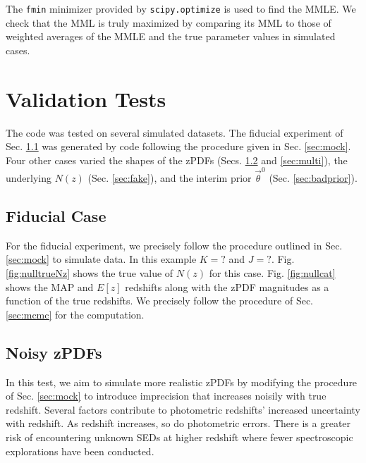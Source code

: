 \documentclass[preprint]{aastex}
\begin{document}
The \texttt{fmin} minimizer provided by \texttt{scipy.optimize} is used to find 
the MMLE.  We check that the MML is truly maximized by comparing its MML to 
those of weighted averages of the MMLE and the true parameter values in 
simulated cases.

\clearpage
\section{Validation Tests}
\label{sec:valid}

The code was tested on several simulated datasets.  The fiducial experiment of 
Sec. \ref{sec:null} was generated by code following the procedure given in Sec. 
\ref{sec:mock}.  Four other cases varied the shapes of the zPDFs (Secs. 
\ref{sec:noisy} and \ref{sec:multi}), the underlying $N(z)$ (Sec. 
\ref{sec:fake}), and the interim prior $\vec{\theta}^{0}$ (Sec. 
\ref{sec:badprior}).  

\clearpage
\subsection{Fiducial Case}
\label{sec:null}

For the fiducial experiment, we precisely follow the procedure outlined in Sec. 
\ref{sec:mock} to simulate data.  In this example $K=?$ and $J=?$.  Fig. 
\ref{fig:nulltrueNz} shows the true value of $N(z)$ for this case.  Fig. 
\ref{fig:nullcat} shows the MAP and $E[z]$ redshifts along with the zPDF 
magnitudes as a function of the true redshifts.  We precisely follow the 
procedure of Sec. \ref{sec:mcmc} for the computation.  


\clearpage
\subsection{Noisy zPDFs}
\label{sec:noisy}

In this test, we aim to simulate more realistic zPDFs by modifying the 
procedure of Sec. \ref{sec:mock} to introduce imprecision that increases 
noisily with true redshift.  Several factors contribute to photometric 
redshifts' increased uncertainty with redshift.  As redshift increases, so do 
photometric errors.  There is a greater risk of encountering unknown SEDs at 
higher redshift where fewer spectroscopic explorations have been conducted.  
\end{document}
